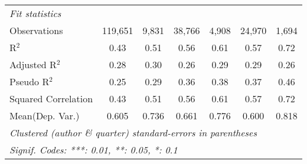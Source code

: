 \begin{tabular}{lcccccc}
   \midrule
   \emph{Fit statistics}\\
   Observations                                               & 119,651        & 9,831       & 38,766       & 4,908   & 24,970        & 1,694\\  
   R$^2$                                                      & 0.43           & 0.51        & 0.56         & 0.61    & 0.57          & 0.72\\  
   Adjusted R$^2$                                             & 0.28           & 0.30        & 0.26         & 0.29    & 0.29          & 0.26\\  
   Pseudo R$^2$                                               & 0.25           & 0.29        & 0.36         & 0.38    & 0.37          & 0.46\\  
   Squared Correlation                                        & 0.43           & 0.51        & 0.56         & 0.61    & 0.57          & 0.72\\  
Mean(Dep. Var.) & 0.605 & 0.736 & 0.661 & 0.776 & 0.600 & 0.818 \\
   \midrule \midrule
   \multicolumn{7}{l}{\emph{Clustered (author \& quarter) standard-errors in parentheses}}\\
   \multicolumn{7}{l}{\emph{Signif. Codes: ***: 0.01, **: 0.05, *: 0.1}}\\
\end{tabular}
\par\endgroup
